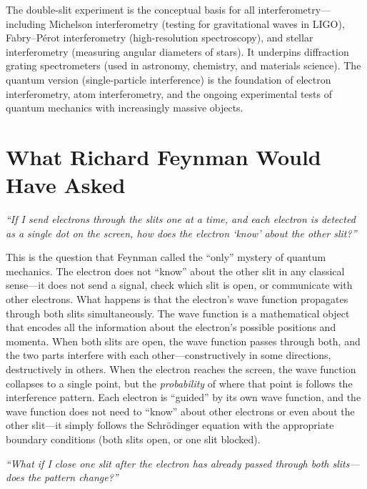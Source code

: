 The double-slit experiment is the conceptual basis for all interferometry---including Michelson interferometry (testing for gravitational waves in LIGO), Fabry--Pérot interferometry (high-resolution spectroscopy), and stellar interferometry (measuring angular diameters of stars). It underpins diffraction grating spectrometers (used in astronomy, chemistry, and materials science). The quantum version (single-particle interference) is the foundation of electron interferometry, atom interferometry, and the ongoing experimental tests of quantum mechanics with increasingly massive objects.
\section*{What Richard Feynman Would Have Asked}

\textit{``If I send electrons through the slits one at a time, and each electron is detected as a single dot on the screen, how does the electron `know' about the other slit?''}

This is the question that Feynman called the ``only'' mystery of quantum mechanics. The electron does not ``know'' about the other slit in any classical sense---it does not send a signal, check which slit is open, or communicate with other electrons. What happens is that the electron's wave function propagates through both slits simultaneously. The wave function is a mathematical object that encodes all the information about the electron's possible positions and momenta. When both slits are open, the wave function passes through both, and the two parts interfere with each other---constructively in some directions, destructively in others. When the electron reaches the screen, the wave function collapses to a single point, but the \emph{probability} of where that point is follows the interference pattern. Each electron is ``guided'' by its own wave function, and the wave function does not need to ``know'' about other electrons or even about the other slit---it simply follows the Schrödinger equation with the appropriate boundary conditions (both slits open, or one slit blocked).

\textit{``What if I close one slit after the electron has already passed through both slits---does the pattern change?''}

